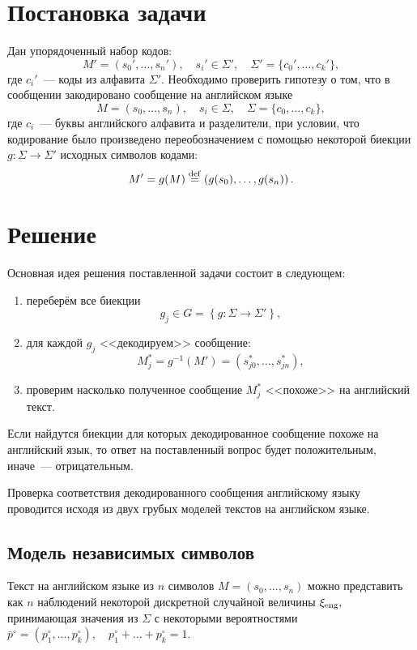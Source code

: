 \documentclass[a4paper,10pt]{article}
\begin{document}



\section{Постановка задачи}
Дан упорядоченный набор кодов:
$$M' = (s_0', \ldots, s_n'), \quad s_i' \in \Sigma', \quad \Sigma' = \{ c_0', \ldots, c_k' \},$$
где $c_i'$~--- коды из алфавита $\Sigma'$.
Необходимо проверить гипотезу о том, что в сообщении закодировано сообщение 
на английском языке
$$M = (s_0, \ldots, s_n), \quad s_i \in \Sigma, \quad \Sigma = \{ c_0, \ldots, c_k \},$$
где $c_i$~--- буквы английского алфавита и разделители, 
при условии, что кодирование было произведено 
переобозначением с помощью некоторой биекции 
$g \colon \Sigma \rightarrow \Sigma'$ 
исходных символов кодами: 
$$M' = g(M) \stackrel{\rm def}{=} \left (g(s_0), \ldots, g(s_n) \right).$$

\section{Решение}
Основная идея решения поставленной задачи состоит в следующем: 
\begin{enumerate}
  \item переберём все биекции
  $$g_j \in G = \left \{ g \colon \Sigma \rightarrow \Sigma' \right \},$$ 
  \item для каждой $g_j$ <<декодируем>> сообщение: 
  $$M^{*}_j = g^{-1}(M') = (s_{j0}^{*}, \ldots, s_{jn}^{*}),$$
  \item проверим насколько полученное сообщение $M^{*}_j$ <<похоже>> на 
  английский текст.
\end{enumerate}
Если найдутся биекции для которых декодированное сообщение похоже на английский
язык, то ответ на поставленный вопрос будет положительным, 
иначе~--- отрицательным.

Проверка соответствия декодированного сообщения английскому языку проводится
исходя из двух грубых моделей текстов на английском языке.

\subsection{Модель независимых символов}
\label{chi2}
Текст на английском языке из $n$ символов $M = (s_0, \ldots, s_n)$
можно представить как $n$ наблюдений некоторой дискретной случайной
величины $\xi_{\rm eng},$ принимающая значения из $\Sigma$ 
с некоторыми вероятностями 
$\bar{p}^\circ = (p_1^{\circ}, \ldots, p_k^{\circ}), \quad
p_1^{\circ} + \ldots + p_k^{\circ} = 1$.
\end{document}
